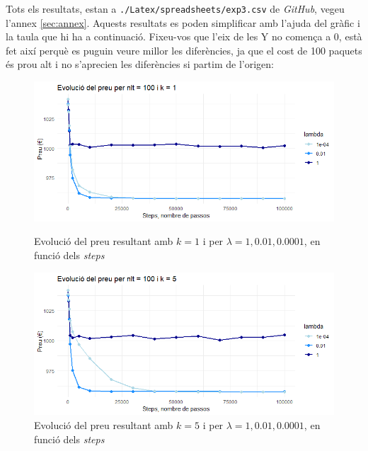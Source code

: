 \documentclass[a4paper]{article}
\begin{document}
	Tots els resultats, estan a \texttt{./Latex/spreadsheets/exp3.csv} de \textit{GitHub}, vegeu l'annex \ref{sec:annex}. Aquests resultats es poden simplificar amb l'ajuda del gràfic i la taula que hi ha a continuació. Fixeu-vos que l'eix de les Y no comença a 0, està fet així perquè es puguin veure millor les diferències, ja que el cost de 100 paquets és prou alt i no s'aprecien les diferències si partim de l'origen:
	
	\begin{figure}[H]
		\centering
		\begin{minipage}{0.45\textwidth}
			\centering
			\includegraphics[width=\textwidth]{images/exp3_k1.png}
			\caption{Evolució del preu resultant amb $k=1$ i per $\lambda = {1, 0.01, 0.0001}$, en funció dels \textit{steps}}
			\label{fig:exp3_k1}
		\end{minipage}%
		\hspace{0.05\textwidth} %
		\begin{minipage}{0.45\textwidth}
			\centering
			\includegraphics[width=\textwidth]{images/exp3_k5.png}
			\caption{Evolució del preu resultant amb $k=5$ i per $\lambda = {1,0.01,0.0001}$, en funció dels \textit{steps}}
			\label{fig:exp3_k5}
		\end{minipage}
	\end{figure}
	
\end{document}
